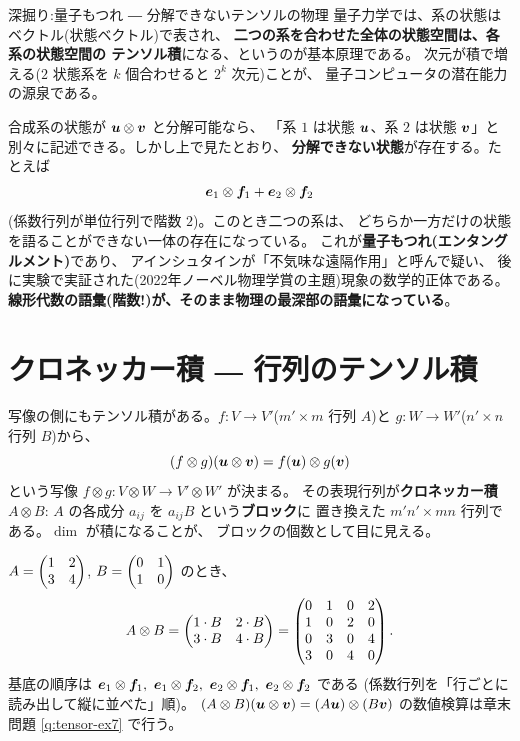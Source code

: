 \begin{itembox}[l]{深掘り:量子もつれ ― 分解できないテンソルの物理}
量子力学では、系の状態はベクトル(状態ベクトル)で表され、
\textbf{二つの系を合わせた全体の状態空間は、各系の状態空間の
テンソル積}になる、というのが基本原理である。
次元が積で増える($2$ 状態系を $k$ 個合わせると $2^k$ 次元)ことが、
量子コンピュータの潜在能力の源泉である。

合成系の状態が $\bm{u} \otimes \bm{v}$ と分解可能なら、
「系 $1$ は状態 $\bm{u}$、系 $2$ は状態 $\bm{v}$」と
別々に記述できる。しかし上で見たとおり、
\textbf{分解できない状態}が存在する。たとえば
\[
\bm{e}_1 \otimes \bm{f}_1 + \bm{e}_2 \otimes \bm{f}_2
\]
(係数行列が単位行列で階数 $2$)。このとき二つの系は、
どちらか一方だけの状態を語ることができない一体の存在になっている。
これが\textbf{量子もつれ(エンタングルメント)}であり、
アインシュタインが「不気味な遠隔作用」と呼んで疑い、
後に実験で実証された(2022年ノーベル物理学賞の主題)現象の数学的正体である。
\textbf{線形代数の語彙(階数!)が、そのまま物理の最深部の語彙になっている}。
\end{itembox}

\section{クロネッカー積 ― 行列のテンソル積}

写像の側にもテンソル積がある。$f : V \to V'$($m' \times m$ 行列 $A$)と
$g : W \to W'$($n' \times n$ 行列 $B$)から、
\[
(f \otimes g)(\bm{u} \otimes \bm{v}) = f(\bm{u}) \otimes g(\bm{v})
\]
という写像 $f \otimes g : V \otimes W \to V' \otimes W'$ が決まる。
その表現行列が\textbf{クロネッカー積} $A \otimes B$:
$A$ の各成分 $a_{ij}$ を $a_{ij}B$ という\textbf{ブロック}に
置き換えた $m'n' \times mn$ 行列である。$\dim$ が積になることが、
ブロックの個数として目に見える。

\begin{rei}[クロネッカー積の計算]\label{rei:tensor-kron}
$A = \begin{pmatrix}1 & 2 \\ 3 & 4\end{pmatrix}$, $B = \begin{pmatrix}0 & 1 \\ 1 & 0\end{pmatrix}$ のとき、
\[
A \otimes B = \begin{pmatrix}1 \cdot B & 2 \cdot B \\ 3 \cdot B & 4 \cdot B\end{pmatrix}
= \begin{pmatrix}0 & 1 & 0 & 2 \\ 1 & 0 & 2 & 0 \\
0 & 3 & 0 & 4 \\ 3 & 0 & 4 & 0\end{pmatrix}.
\]
基底の順序は $\vect{e}_1 \otimes \vect{f}_1,\ \vect{e}_1 \otimes \vect{f}_2,\
\vect{e}_2 \otimes \vect{f}_1,\ \vect{e}_2 \otimes \vect{f}_2$ である
(係数行列を「行ごとに読み出して縦に並べた」順)。
$(A \otimes B)(\bm{u} \otimes \bm{v}) = (A\bm{u}) \otimes (B\bm{v})$
の数値検算は章末問題 \ref{q:tensor-ex7} で行う。
\end{rei}

